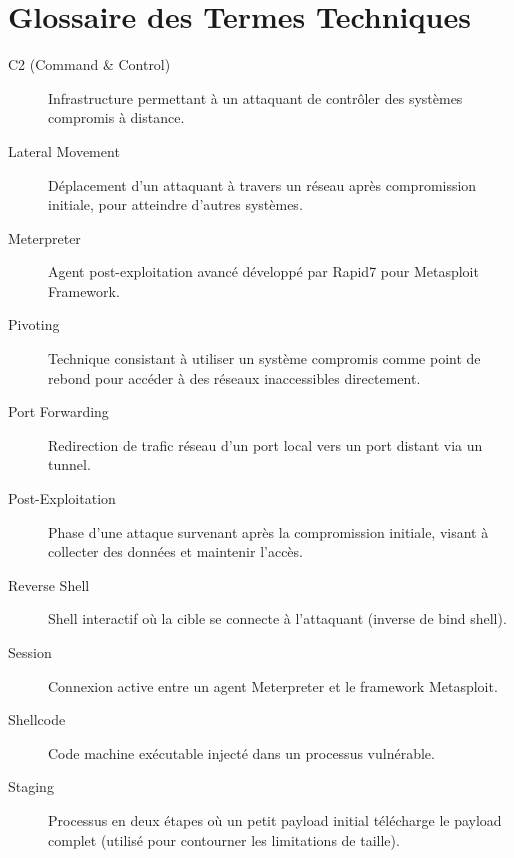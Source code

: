 \documentclass[12pt,a4paper,openany]{report}
\begin{document}
	\section{Glossaire des Termes Techniques}
	
	\begin{description}
		\item[C2 (Command \& Control)] Infrastructure permettant à un attaquant de contrôler des systèmes compromis à distance.
		
		\item[Lateral Movement] Déplacement d'un attaquant à travers un réseau après compromission initiale, pour atteindre d'autres systèmes.
		
		\item[Meterpreter] Agent post-exploitation avancé développé par Rapid7 pour Metasploit Framework.
		
		\item[Pivoting] Technique consistant à utiliser un système compromis comme point de rebond pour accéder à des réseaux inaccessibles directement.
		
		\item[Port Forwarding] Redirection de trafic réseau d'un port local vers un port distant via un tunnel.
		
		\item[Post-Exploitation] Phase d'une attaque survenant après la compromission initiale, visant à collecter des données et maintenir l'accès.
		
		\item[Reverse Shell] Shell interactif où la cible se connecte à l'attaquant (inverse de bind shell).
		
		\item[Session] Connexion active entre un agent Meterpreter et le framework Metasploit.
		
		\item[Shellcode] Code machine exécutable injecté dans un processus vulnérable.
		
		\item[Staging] Processus en deux étapes où un petit payload initial télécharge le payload complet (utilisé pour contourner les limitations de taille).
	\end{description}
	
	
\end{document}
